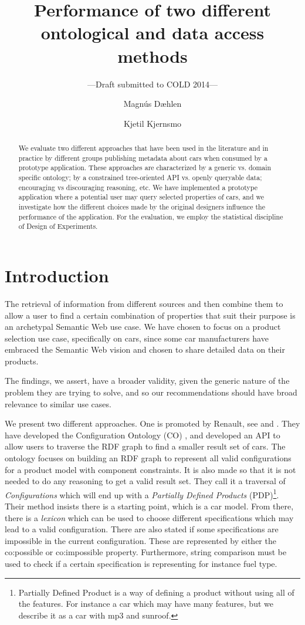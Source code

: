 \documentclass{llncs}
\title{Performance of two different ontological and data access methods}
\author{Magn\'{u}s D\ae hlen \and Kjetil Kjernsmo}
\institute{Department of Informatics,
Postboks 1080 Blindern,
N-0316 Oslo, Norway \email{\{magnudae,kjekje\}@ifi.uio.no} }
\subtitle{---Draft submitted to COLD 2014---}
\begin{document}
\maketitle

\begin{abstract}
  We evaluate two different approaches that have been used in the
  literature and in practice by different groups publishing metadata
  about cars when consumed by a prototype application. These
  approaches are characterized by a generic vs. domain specific
  ontology; by a constrained tree-oriented API vs. openly queryable
  data; encouraging vs discouraging reasoning, etc.  We have
  implemented a prototype application where a potential user may query
  selected properties of cars, and we investigate how the different
  choices made by the original designers influence the performance of
  the application. For the evaluation, we employ the statistical
  discipline of Design of Experiments.

\end{abstract}

\section{Introduction}

The retrieval of information from different sources and then combine
them to allow a user to find a certain combination of properties that
suit their purpose is an archetypal Semantic Web use case. We have
chosen to focus on a product selection use case, specifically on cars,
since some car manufacturers have embraced the Semantic Web vision and chosen
to share detailed data on their products.

The findings, we assert, have a broader validity, given the generic
nature of the problem they are trying to solve, and so our
recommendations should have broad relevance to similar use cases.

We present two different approaches. One is promoted by Renault, see
\cite{SemWebAppRes} and \cite{ren1}. They have developed the
Configuration Ontology (CO) \cite{confOnt}, and developed an API to allow
users to traverse the RDF graph to find a smaller result set of cars.
The ontology focuses on building an RDF graph to represent all valid
configurations for a product model with component constraints.  It is
also made so that it is not needed to do any reasoning to get a valid
result set.  They call it a traversal of \emph{Configurations} which
will end up with a \emph{Partially Defined Products}
(PDP)\footnote{Partially Defined Product is a way of defining a
  product without using all of the features. For instance a car which
  may have many features, but we describe it as a car with mp3 and
  sunroof.}.  Their method insists there is a starting point, which is
a car model. From there, there is a \emph{lexicon} which can be used
to choose different specifications which may lead to a valid
configuration. There are also stated if some specifications are
impossible in the current configuration.  These are represented by
either the \textsf{co:possible} or \textsf{co:impossible}
property. Furthermore, string comparison must be used to check if a
certain specification is representing for instance fuel type.
\end{document}
